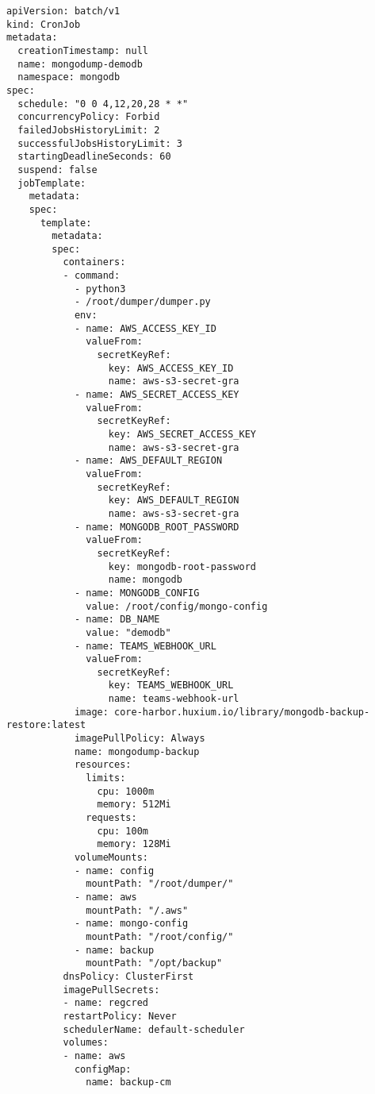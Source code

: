 \newenvironment{code}{\captionsetup{type=listing}}{}
\begin{code}
\begin{verbatim}
apiVersion: batch/v1
kind: CronJob
metadata:
  creationTimestamp: null
  name: mongodump-demodb
  namespace: mongodb
spec:
  schedule: "0 0 4,12,20,28 * *"
  concurrencyPolicy: Forbid
  failedJobsHistoryLimit: 2
  successfulJobsHistoryLimit: 3
  startingDeadlineSeconds: 60
  suspend: false
  jobTemplate:
    metadata:
    spec:
      template:
        metadata:
        spec:
          containers:
          - command:
            - python3
            - /root/dumper/dumper.py
            env:
            - name: AWS_ACCESS_KEY_ID
              valueFrom:
                secretKeyRef:
                  key: AWS_ACCESS_KEY_ID
                  name: aws-s3-secret-gra
            - name: AWS_SECRET_ACCESS_KEY
              valueFrom:
                secretKeyRef:
                  key: AWS_SECRET_ACCESS_KEY
                  name: aws-s3-secret-gra
            - name: AWS_DEFAULT_REGION
              valueFrom:
                secretKeyRef:
                  key: AWS_DEFAULT_REGION
                  name: aws-s3-secret-gra
            - name: MONGODB_ROOT_PASSWORD
              valueFrom:
                secretKeyRef:
                  key: mongodb-root-password
                  name: mongodb
            - name: MONGODB_CONFIG
              value: /root/config/mongo-config
            - name: DB_NAME
              value: "demodb"
            - name: TEAMS_WEBHOOK_URL
              valueFrom:
                secretKeyRef:
                  key: TEAMS_WEBHOOK_URL
                  name: teams-webhook-url
            image: core-harbor.huxium.io/library/mongodb-backup-restore:latest
            imagePullPolicy: Always
            name: mongodump-backup
            resources: 
              limits:
                cpu: 1000m
                memory: 512Mi
              requests:
                cpu: 100m
                memory: 128Mi
            volumeMounts:
            - name: config
              mountPath: "/root/dumper/"
            - name: aws
              mountPath: "/.aws"
            - name: mongo-config
              mountPath: "/root/config/"
            - name: backup
              mountPath: "/opt/backup"
          dnsPolicy: ClusterFirst
          imagePullSecrets:
          - name: regcred
          restartPolicy: Never
          schedulerName: default-scheduler
          volumes:
          - name: aws
            configMap:
              name: backup-cm

\end{verbatim}
\end{code}

